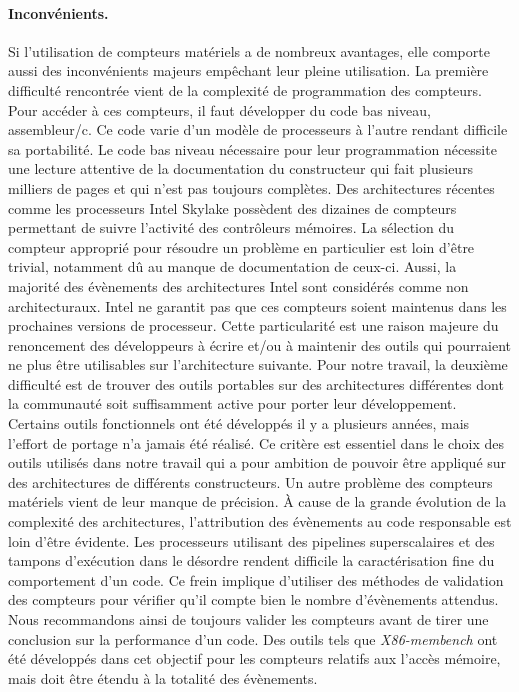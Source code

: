         \paragraph{Inconvénients.} Si l'utilisation de compteurs matériels a de nombreux avantages, elle comporte aussi des inconvénients majeurs empêchant leur pleine utilisation. 
        La première difficulté rencontrée vient de la complexité de programmation des compteurs. Pour accéder à ces compteurs, il faut développer du code bas niveau, assembleur/c. Ce code varie d'un modèle de processeurs à l'autre rendant difficile sa portabilité. Le code bas niveau nécessaire pour leur programmation nécessite une lecture attentive de la documentation du constructeur qui fait plusieurs milliers de pages et qui n'est pas toujours complètes. Des architectures récentes comme les processeurs Intel Skylake possèdent des dizaines de compteurs permettant de suivre l'activité des contrôleurs mémoires. La sélection du compteur approprié pour résoudre un problème en particulier est loin d'être trivial, notamment dû au manque de documentation de ceux-ci.
        Aussi, la majorité des évènements des architectures Intel sont considérés comme non architecturaux. Intel ne garantit pas que ces compteurs soient maintenus dans les prochaines versions de processeur. Cette particularité est une raison majeure du renoncement des développeurs à écrire et/ou à maintenir des outils qui pourraient ne plus être utilisables sur l'architecture suivante.
        Pour notre travail, la deuxième difficulté est de trouver des outils portables sur des architectures différentes dont la communauté soit suffisamment active pour porter leur développement. Certains outils fonctionnels ont été développés il y a plusieurs années, mais l'effort de portage n'a jamais été réalisé. Ce critère est essentiel dans le choix des outils utilisés dans notre travail qui a pour ambition de pouvoir être appliqué sur des architectures de différents constructeurs.
        Un autre problème des compteurs matériels vient de leur manque de précision. À cause de la grande évolution de la complexité des architectures, l'attribution des évènements au code responsable est loin d'être évidente. Les processeurs utilisant des pipelines superscalaires et des tampons d'exécution dans le désordre rendent difficile la caractérisation fine du comportement d'un code. Ce frein implique d'utiliser des méthodes de validation des compteurs pour vérifier qu'il compte bien le nombre d'évènements attendus. Nous recommandons ainsi de toujours valider les compteurs avant de tirer une conclusion sur la performance d'un code. Des outils tels que \textit{X86-membench}\cite{Molka2017} ont été développés dans cet objectif pour les compteurs relatifs aux l’accès mémoire, mais doit être étendu à la totalité des évènements.

